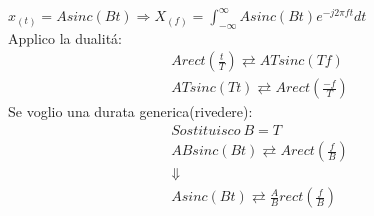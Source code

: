                 {
                    $x_{(t)}=Asinc(Bt) \Rightarrow X_{(f)} = \int_{-\infty}^{\infty}A sinc(Bt)e^{-j2\pi ft}dt$ \\
                    Applico la dualitá:
                    \begin{gather}
                        A rect\left(\frac{t}{T}\right) \rightleftarrows ATsinc(Tf) \nonumber \\
                        ATsinc(Tt) \rightleftarrows A rect\left(\frac{-f}{T}\right) \nonumber
                    \end{gather}
                    Se voglio una durata generica(rivedere):
                    \begin{gather}
                        Sostituisco\ B=T \nonumber \\
                        ABsinc(Bt) \rightleftarrows A rect\left(\frac{f}{B}\right) \nonumber  \\
                        \Downarrow \nonumber \\
                        Asinc(Bt) \rightleftarrows \frac{A}{B}rect\left(\frac{f}{B}\right) \nonumber
                    \end{gather}
                }

